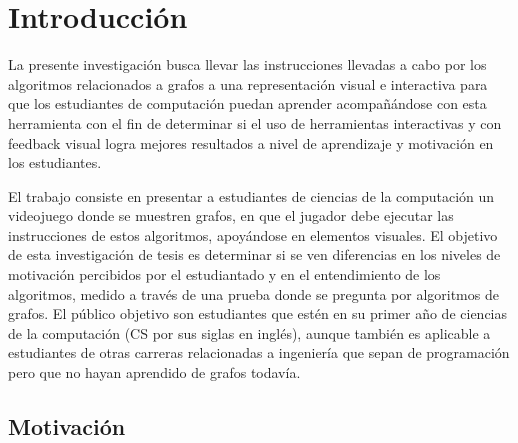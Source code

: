 \chapter{Introducción}

La presente investigación busca llevar las instrucciones llevadas a cabo por los algoritmos relacionados a grafos 
a una representación visual e interactiva para que los estudiantes de computación puedan aprender acompañándose con 
esta herramienta con el fin de determinar si el uso de herramientas interactivas y con feedback visual logra mejores 
resultados a nivel de aprendizaje y motivación en los estudiantes.

El trabajo consiste en presentar a estudiantes de ciencias de la computación un videojuego donde se muestren grafos, 
en que el jugador debe ejecutar las instrucciones de estos algoritmos, apoyándose en elementos visuales. 
El objetivo de esta investigación de tesis es determinar si se ven diferencias en los niveles de motivación percibidos por 
el estudiantado y en el entendimiento de los algoritmos, medido a través de una prueba donde se pregunta por algoritmos de grafos.
El público objetivo son estudiantes que estén en su primer año de ciencias de la computación (CS por sus siglas en inglés), 
aunque también es aplicable a estudiantes de otras carreras relacionadas a ingeniería que sepan de programación pero que
no hayan aprendido de grafos todavía.


\section{Motivación}

